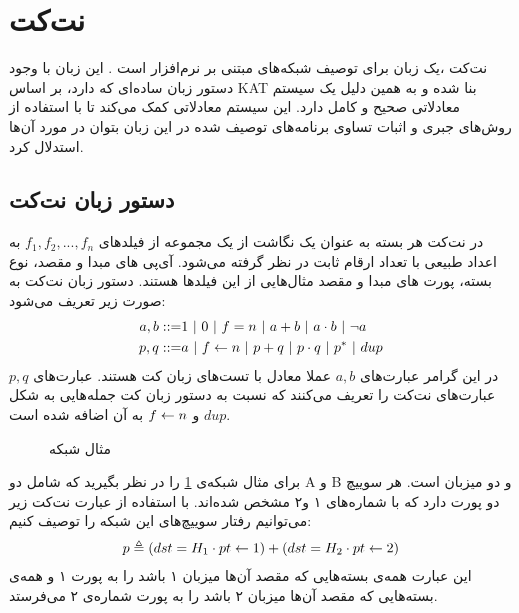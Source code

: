 \section{نت‌کت }
نت‌کت
،یک زبان برای توصیف شبکه‌های مبتنی بر نرم‌افزار است
\cite{netkat}.
این زبان با وجود دستور زبان
ساده‌ای که دارد، بر اساس
KAT
\cite{kat}
بنا شده و به همین دلیل یک سیستم معادلاتی صحیح و کامل
دارد.
این سیستم معادلاتی کمک می‌کند تا با استفاده از روش‌های جبری و اثبات تساوی برنامه‌های توصیف شده در این زبان بتوان در مورد آن‌ها استدلال کرد.

\subsection{دستور زبان نت‌کت}
در نت‌کت هر بسته
به عنوان یک نگاشت از یک مجموعه از فیلد‌های
$f_1,f_2,...,f_n$
به اعداد طبیعی با تعداد ارقام ثابت در نظر گرفته می‌شود.
آی‌پی‌
های مبدا و مقصد، نوع بسته، پورت‌
های مبدا و مقصد مثال‌هایی از این فیلد‌ها هستند.
دستور زبان نت‌کت به صورت زیر تعریف می‌شود:
\begin{align*}
    a,b ::= & 1 ~|~ 0 ~|~ f = n ~|~ a + b ~|~ a \cdot b ~|~ \neg a  \\
    p,q ::= & a ~|~ f \leftarrow n ~|~ p + q ~|~ p \cdot q ~|~ p^* ~|~ dup
\end{align*}
در این گرامر عبارت‌های
$a,b$
عملا معادل با تست‌های زبان کت
هستند.
عبارت‌های
$p,q$
عبارت‌های نت‌کت را تعریف می‌کنند که نسبت به دستور زبان کت
جمله‌هایی به شکل
$dup$
و
$f \leftarrow n$
به آن اضافه شده است.
\begin{figure}
    \centering
    \caption{مثال شبکه}
    \label{fig:netkat:ssh}
\end{figure}
برای مثال شبکه‌ی
\ref{fig:netkat:ssh}
را در نظر بگیرید که شامل دو
A و ‌B
و دو میزبان
است.
هر سوییچ دو پورت دارد که با شماره‌های ۱ و۲ مشخص شده‌اند.
با استفاده از عبارت نت‌کت زیر می‌توانیم رفتار سوییچ‌های این شبکه را توصیف کنیم:
\begin{align}
    \label{eq:netkat:swp}
    p \triangleq (dst = H_1 \cdot pt \leftarrow 1) +
    (dst = H_2 \cdot pt \leftarrow 2)
\end{align}
این عبارت همه‌ی بسته‌هایی که مقصد آن‌ها میزبان ۱ باشد را به پورت ۱ و همه‌ی بسته‌هایی که مقصد‌ آن‌ها میزبان ۲ باشد را به پورت شماره‌ی ۲ می‌فرستد.


